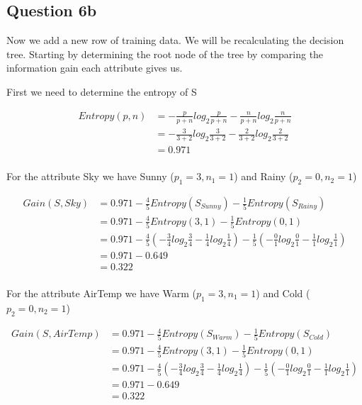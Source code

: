 \documentclass[10pt,a4paper]{article}
\begin{document}
{{{{{{{{{{\subsection{Question 6b}
Now we add a new row of training data. We will be recalculating the decision tree. Starting by determining the root node of the tree by comparing the information gain each attribute gives us.

First we need to determine the entropy of S

\begin{equation}
\begin{split}
Entropy(p,n) &=  -\frac{p}{p+n}log_2\frac{p}{p+n} - \frac{n}{p+n}log_2\frac{n}{p+n}  \\
           &= -\frac{3}{3+2} log_2\frac{3}{3+2} -\frac{2}{3+2} log_2\frac{2}{3+2} \\
           &= 0.971   \\
\end{split}
\end{equation}

For the attribute Sky we have Sunny ($p_1=3,n_1=1$) and Rainy ($p_2=0,n_2=1$)

\begin{equation}
\begin{split}
Gain(S,Sky) &= 0.971 -\frac{4}{5} Entropy(S_{Sunny} ) - \frac{1}{5}Entropy(S_{Rainy}) \\
          &= 0.971 - \frac{4}{5} Entropy(3,1) - \frac{1}{5}Entropy(0,1) \\
          &= 0.971 -\frac{4}{5} ( -\frac{3}{4} log_2\frac{3}{4} -\frac{1}{4} log_2\frac{1}{4} ) - \frac{1}{5}(-\frac{0}{1} log_2\frac{0}{1} - \frac{1}{1}log_2\frac{1}{1} ) \\
          &= 0.971 - 0.649\\
          &= 0.322 \\
\end{split}
\end{equation}

For the attribute AirTemp we have Warm ($p_1=3,n_1=1$) and Cold ($p_2=0,n_2=1$)

\begin{equation}
\begin{split}
Gain(S,AirTemp) &= 0.971 - \frac{4}{5} Entropy(S_{Warm} ) - \frac{1}{5}Entropy(S_{Cold}) \\
          &= 0.971 - \frac{4}{5} Entropy(3,1) - \frac{1}{5}Entropy(0,1) \\
          &= 0.971 -\frac{4}{5} ( -\frac{3}{4} log_2\frac{3}{4} -\frac{1}{4} log_2\frac{1}{4} ) - \frac{1}{5}(-\frac{0}{1} log_2\frac{0}{1} - \frac{1}{1}log_2\frac{1}{1} ) \\
          &= 0.971 - 0.649\\
          &= 0.322 \\
\end{split}
\end{equation}

}}}}}}}}}}
\end{document}
